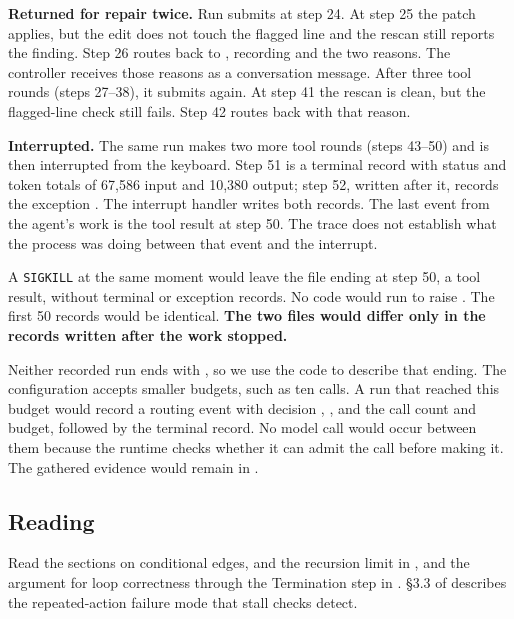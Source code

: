 \item \textbf{Returned for repair twice.} Run  submits at step 24. At step 25 the
patch applies, but the edit does not touch the flagged line and the rescan still reports the finding. Step
26 routes back to , recording  and the two reasons.
The controller receives those reasons as a conversation message. After three tool rounds
(steps 27--38), it submits again. At step 41 the rescan is clean, but the flagged-line check still
fails. Step 42 routes back with that reason.

\item \textbf{Interrupted.} The same run makes two more tool rounds (steps 43--50) and is then
interrupted from the keyboard. Step 51 is a terminal record with status  and token
totals of 67,586 input and 10,380 output; step 52, written after it, records the exception
. The interrupt handler writes both records. The last event from the
agent's work is the tool result at step 50. The trace does not establish what the process was
doing between that event and the interrupt.

\ei

A \texttt{SIGKILL} at the same moment would leave the file ending at step 50, a tool result,
without terminal or exception records. No code would run to raise .
The first 50 records would be identical. \textbf{The two files would differ only in the records
written after the work stopped.}

Neither recorded run ends with , so we use the code to describe that
ending. The configuration accepts smaller budgets, such as ten calls. A run that reached this
budget would record a routing event with decision
, , and the call count and budget, followed by the
terminal record. No model call would occur between them because the runtime checks whether it
can admit the call before making it.
The gathered evidence would remain in .

\subsection{Reading}

Read the sections on conditional edges,  and the recursion limit in
\citet{langgraph-graph-api}, and the argument for loop correctness through the Termination step in
\citet{cornell-cs2112-loopinv}. \S3.3 of \citet{yao2023react} describes the repeated-action failure mode that
stall checks detect.

